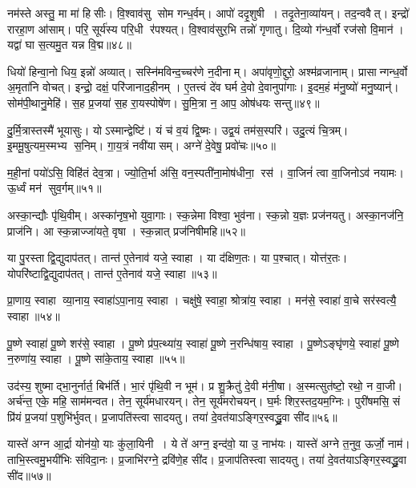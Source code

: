 नम॑स्ते अस्तु॒ मा मा॑ हिसीः। वि॒श्वाव॑सु सोम गन्ध॒र्वम्। आपो॑ ददृ॒शुषी। तदृ॒तेना॒व्या॑यन्। तद॒न्ववैत्। इन्द्रो॑ रारहा॒ण आ॑साम्। परि॒ सूर्य॑स्य परि॒धी र॑पश्यत्। वि॒श्वाव॑सुर॒भि तन्नो॑ गृणातु। दि॒व्यो ग॑न्ध॒र्वो रज॑सो वि॒मान॑। यद्वा॑ घा स॒त्यमु॒त यन्न वि॒द्म॥४८॥

धियो॑ हिन्वा॒नो धिय॒ इन्नो॑ अव्यात्। सस्नि॑मविन्द॒च्चर॑णे न॒दीनाम्। अपा॑वृणो॒द्दुरो॒ अश्म॑व्रजानाम्। प्रासान्गन्ध॒र्वो अ॒मृता॑नि वोचत्। इन्द्रो॒ दक्षं॒ परि॑जानाद॒हीनम्। ए॒तत्त्वं दे॑व घर्म दे॒वो दे॒वानुपा॑गाः। इ॒दम॒हं म॑नु॒ष्यो॑ मनु॒ष्यान्॑। सोम॑पी॒थानु॒मेहि॑। स॒ह प्र॒जया॑ स॒ह रा॒यस्पोषे॑ण। सु॒मि॒त्रा न॒ आप॒ ओष॑धयः सन्तु॥४९॥

दु॒र्मि॒त्रास्तस्मै॑ भूयासुः। योऽस्मान्द्वेष्टि॑। यं च॑ व॒यं द्वि॒ष्मः। उद्व॒यं तम॑स॒स्परि॑। उदु॒त्यं चि॒त्रम्। इ॒ममू॒षुत्यम॒स्मभ्य स॒निम्। गा॒य॒त्रं नवी॑यासम्। अग्ने॑ दे॒वेषु॒ प्रवो॑चः॥५०॥
\anuvakamend[याऽऽग्नीध्रे॒ तान्त॑ ए॒तेनाव॑ यजे॒ स्वाहा॒ धर्म॑णा शं॒ युधा॑याः प्यासिषी॒महि॒ पोषे॑ण॒ निष॑त्तो वि॒द्म स॑न्त्व॒ष्टौ]

म॒ही॒नां पयो॑ऽसि॒ विहि॑तं देव॒त्रा। ज्यो॒ति॒र्भा अ॑सि॒ वन॒स्पती॑ना॒\-मोष॑धीना॒ रस॑। वा॒जिनं॑ त्वा वा॒जिनोऽव॑ नयामः। ऊ॒र्ध्वं मन॑ सुव॒र्गम्॥५१॥
\anuvakamend

अस्का॒न्द्यौः पृ॑थि॒वीम्। अस्का॑नृष॒भो युवा॒गाः। स्क॒न्नेमा विश्वा॒ भुव॑ना। स्क॒न्नो य॒ज्ञः प्रज॑नयतु। अस्का॒नज॑नि॒ प्राज॑नि। आ स्क॒न्नाज्जा॑यते॒ वृषा। स्क॒न्नात् प्रज॑निषीमहि॥५२॥
\anuvakamend

या पु॒रस्ताद्वि॒द्युदाप॑तत्। तान्त॑ ए॒तेनाव॑ यजे॒ स्वाहा। या द॑क्षिण॒तः। या प॒श्चात्। योत्त॑र॒तः। योपरि॑ष्टाद्वि॒द्युदाप॑तत्। तान्त॑ ए॒तेनाव॑ यजे॒ स्वाहा॥५३॥
\anuvakamend

प्रा॒णाय॒ स्वाहा व्या॒नाय॒ स्वाहा॑ऽपा॒नाय॒ स्वाहा। चक्षु॑षे॒ स्वाहा॒ श्रोत्रा॑य॒ स्वाहा। मन॑से॒ स्वाहा॑ वा॒चे सर॑स्वत्यै॒ स्वाहा॥५४॥%
\anuvakamend

पू॒ष्णे स्वाहा॑ पू॒ष्णे शर॑से॒ स्वाहा। पू॒ष्णे प्र॑प॒त्थ्या॑य॒ स्वाहा॑ पू॒ष्णे न॒रन्धि॑षाय॒ स्वाहा। पू॒ष्णेऽङ्घृ॑णये॒ स्वाहा॑ पू॒ष्णे न॒रुणा॑य॒ स्वाहा। पू॒ष्णे सा॑के॒ताय॒ स्वाहा॥५५॥
\anuvakamend


उद॑स्य॒ शुष्माद्भा॒नुर्नार्त॒ बिभ॑र्ति। भा॒रं पृ॑थि॒वी न भूम॑। प्र शु॒क्रैतु॑ दे॒वी म॑नी॒षा। अ॒स्मत्सुत॑ष्टो॒ रथो॒ न वा॒जी। अर्च॑न्त॒ एके॒ महि॒ साम॑मन्वत। तेन॒ सूर्य॑मधारयन्। तेन॒ सूर्य॑मरोचयन्। घ॒र्मः  शिर॒स्तद॒यम॒ग्निः। पुरी॑षमसि॒ सं प्रि॑यं प्र॒जया॑ प॒शुभि॑र्भुवत्। प्र॒जापति॑स्त्वा सादयतु। तया॑ दे॒वत॑याऽङ्गिर॒स्वद्ध्रु॒वा सी॑द॥५६॥
\anuvakamend

यास्ते॑ अग्न आ॒र्द्रा योन॑यो॒ याः कु॑ला॒यिनी। ये ते॑ अग्न॒ इन्द॑वो॒ या उ॒ नाभ॑यः। यास्ते॑ अग्ने त॒नुव॒ ऊर्जो॒ नाम॑। ताभि॒स्त्वमु॒भयी॑भिः संविदा॒नः। प्र॒जाभि॑रग्ने॒ द्रवि॑णे॒ह सी॑द। प्र॒जाप॑तिस्त्वा सादयतु। तया॑ दे॒वत॑याऽङ्गिर॒स्वद्ध्रु॒वा सी॑द॥५७॥
\anuvakamend

